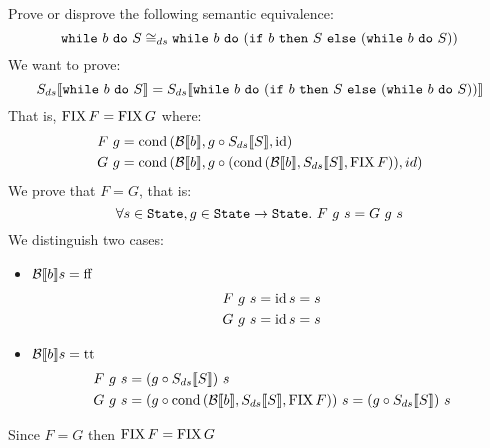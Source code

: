 \begin{exercise}{
    Prove or disprove the following semantic equivalence:
    \[ \wwhile{b}{S} \DScong \wwhile{b}{(\wif{b}{S}{(\wwhile{b}{S})})} \]
}
    We want to prove:
    \[ \Sds{\wwhile{b}{S}} = \Sds{\wwhile{b}{(\wif{b}{S}{(\wwhile{b}{S})})}} \]
    That is, $\FIX F = \FIX G$ where:
    \begin{align*}
        F\ g &= \cond{\Bool{b}}{g \circ \Sds{S}}{\id} \\
        G\ g &= \cond{\Bool{b}}{g \circ (\cond{\Bool{b}}{\Sds{S}}{\FIX F})}{id}
    \end{align*}
    We prove that $F = G$, that is:
    \[ \forall s \in \State, g \in \State \to \State.\ F\ g\ s = G\ g\ s \]
    We distinguish two cases:
    \begin{itemize}
        \item $\Bool{b} s = \False$
            \begin{align*}
                F\ g \ s = \id s = s \\
                G\ g \ s = \id s = s
            \end{align*}
        \item $\Bool{b} s = \True$
            \begin{align*}
                F\ g\ s &= (g \circ \Sds{S})\ s \\
                G\ g\ s &= (g \circ \cond{\Bool{b}}{\Sds{S}}{\FIX F})\ s = (g \circ \Sds{S})\ s
            \end{align*}
    \end{itemize}
    Since $F = G$ then $\FIX F = \FIX G$
\end{exercise}
